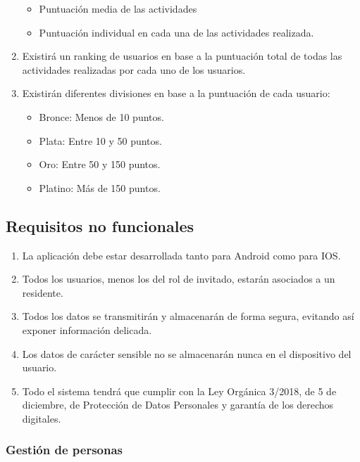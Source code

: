 \begin{enumerate}[start=36,label={RF-\arabic*.}]
\begin{itemize}
            \item Puntuación media de las actividades
            \item Puntuación individual en cada una de las actividades realizada.
        \end{itemize}
    \item Existirá un ranking de usuarios en base a la puntuación total de todas las actividades realizadas por cada uno de los usuarios.
    \item Existirán diferentes divisiones en base a la puntuación de cada usuario:
        \begin{itemize}
            \item Bronce: Menos de 10 puntos.
            \item Plata: Entre 10 y 50 puntos.
            \item Oro: Entre 50 y 150 puntos.
            \item Platino: Más de 150 puntos.
        \end{itemize}

\end{enumerate}

\subsection{Requisitos no funcionales}

\begin{enumerate}[start=1,label={RNF-\arabic*.}]
    \item La aplicación debe estar desarrollada tanto para Android como para IOS.
    \item Todos los usuarios, menos los del rol de invitado, estarán asociados a un residente.
    \item Todos los datos se transmitirán y almacenarán de forma segura, evitando así exponer información delicada.
    \item Los datos de carácter sensible no se almacenarán nunca en el dispositivo del usuario.
    \item Todo el sistema tendrá que cumplir con la Ley Orgánica 3/2018, de 5 de diciembre, de Protección de Datos Personales y garantía de los derechos digitales.
\end{enumerate}

\subsubsection{Gestión de personas}

